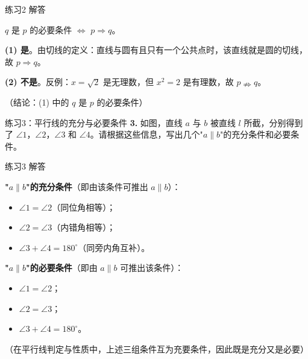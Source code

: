 \documentclass[10pt,aspectratio=169,serif]{beamer}
\begin{document}
\begin{frame}[t]{练习2 解答}
\begin{tcolorbox}[colback=orange!10,colframe=orange,title=\textbf{解}]
$q$ 是 $p$ 的必要条件 $\Longleftrightarrow$ $p\Rightarrow q$。

\textbf{(1) 是}。由切线的定义：直线与圆有且只有一个公共点时，该直线就是圆的切线，故 $p\Rightarrow q$。

\textbf{(2) 不是}。反例：$x=\sqrt{2}$ 是无理数，但 $x^2=2$ 是有理数，故 $p\nRightarrow q$。

\vspace{0.5em}
\small（结论：(1) 中的 $q$ 是 $p$ 的必要条件）
\end{tcolorbox}
\end{frame}

\begin{frame}[t]{练习3：平行线的充分与必要条件}
\textbf{3.} 如图，直线 $a$ 与 $b$ 被直线 $l$ 所截，分别得到了 $\angle 1$，$\angle 2$，$\angle 3$ 和 $\angle 4$。请根据这些信息，写出几个"$a \parallel b$"的充分条件和必要条件。

\vspace{0.5em}
\begin{center}
\end{center}
\end{frame}

\begin{frame}[t]{练习3 解答}
\begin{tcolorbox}[colback=orange!10,colframe=orange,title=\textbf{解}]
\textbf{"$a\parallel b$"的充分条件}（即由该条件可推出 $a\parallel b$）：
\begin{itemize}
  \item $\angle 1 = \angle 2$（同位角相等）；
  \item $\angle 2 = \angle 3$（内错角相等）；
  \item $\angle 3 + \angle 4 = 180^\circ$（同旁内角互补）。
\end{itemize}

\vspace{0.5em}
\textbf{"$a\parallel b$"的必要条件}（即由 $a\parallel b$ 可推出该条件）：
\begin{itemize}
  \item $\angle 1 = \angle 2$；
  \item $\angle 2 = \angle 3$；
  \item $\angle 3 + \angle 4 = 180^\circ$。
\end{itemize}
\vspace{0.5em}
\small（在平行线判定与性质中，上述三组条件互为充要条件，因此既是充分又是必要）
\end{tcolorbox}
\end{frame}
\end{document}
